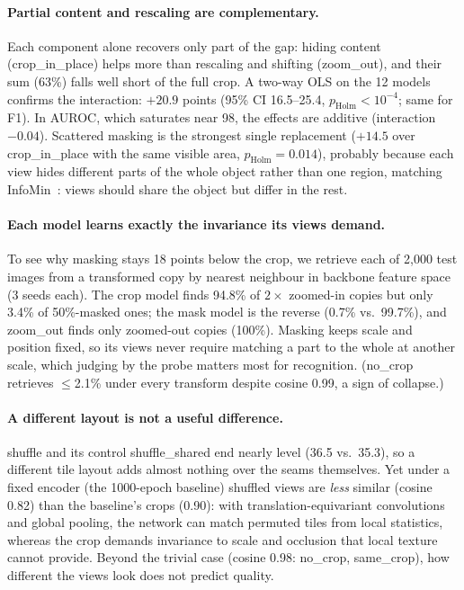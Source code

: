 \documentclass[10pt,twocolumn,letterpaper]{article}
\begin{document}
\paragraph{Partial content and rescaling are complementary.}
Each component alone recovers only part of the gap: hiding content (crop\_in\_place) helps more than rescaling and shifting (zoom\_out), and their sum (63\%) falls well short of the full crop. A two-way OLS on the 12 models confirms the interaction: $+20.9$ points (95\% CI 16.5--25.4, $p_\text{Holm}<10^{-4}$; same for F1). In AUROC, which saturates near 98, the effects are additive (interaction $-0.04$).
Scattered masking is the strongest single replacement ($+14.5$ over crop\_in\_place with the same visible area, $p_\text{Holm}{=}0.014$), probably because each view hides different parts of the whole object rather than one region, matching InfoMin~\cite{tian2020infomin}: views should share the object but differ in the rest.

\paragraph{Each model learns exactly the invariance its views demand.}
To see why masking stays 18 points below the crop, we retrieve each of 2,000 test images from a transformed copy by nearest neighbour in backbone feature space (3 seeds each).
The crop model finds 94.8\% of $2\times$ zoomed-in copies but only 3.4\% of 50\%-masked ones; the mask model is the reverse (0.7\% vs.\ 99.7\%), and zoom\_out finds only zoomed-out copies (100\%).
Masking keeps scale and position fixed, so its views never require matching a part to the whole at another scale, which judging by the probe matters most for recognition.
(no\_crop retrieves $\le$2.1\% under every transform despite cosine 0.99, a sign of collapse.)

\paragraph{A different layout is not a useful difference.}
shuffle and its control shuffle\_shared end nearly level (36.5 vs.\ 35.3), so a different tile layout adds almost nothing over the seams themselves.
Yet under a fixed encoder (the 1000-epoch baseline) shuffled views are \emph{less} similar (cosine 0.82) than the baseline's crops (0.90): with translation-equivariant convolutions and global pooling, the network can match permuted tiles from local statistics, whereas the crop demands invariance to scale and occlusion that local texture cannot provide.
Beyond the trivial case (cosine 0.98: no\_crop, same\_crop), how different the views look does not predict quality.
\end{document}
